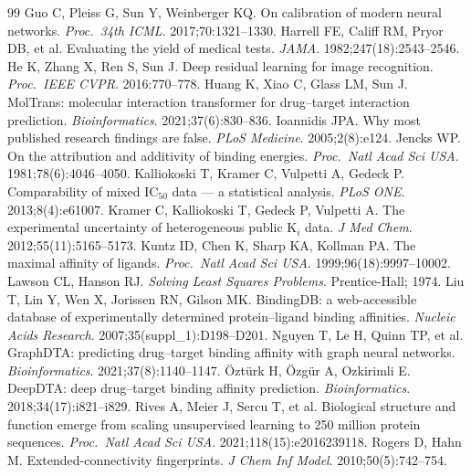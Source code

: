 \documentclass[10pt,letterpaper]{article}
\begin{document}
\begin{thebibliography}{99}
 Guo C, Pleiss G, Sun Y, Weinberger KQ. On calibration of modern neural networks. \emph{Proc.\ 34th ICML}. 2017;70:1321--1330.
 Harrell FE, Califf RM, Pryor DB, et al. Evaluating the yield of medical tests. \emph{JAMA}. 1982;247(18):2543--2546.
 He K, Zhang X, Ren S, Sun J. Deep residual learning for image recognition. \emph{Proc.\ IEEE CVPR}. 2016:770--778.
 Huang K, Xiao C, Glass LM, Sun J. MolTrans: molecular interaction transformer for drug--target interaction prediction. \emph{Bioinformatics}. 2021;37(6):830--836.
 Ioannidis JPA. Why most published research findings are false. \emph{PLoS Medicine}. 2005;2(8):e124.
 Jencks WP. On the attribution and additivity of binding energies. \emph{Proc.\ Natl Acad Sci USA}. 1981;78(6):4046--4050.
 Kalliokoski T, Kramer C, Vulpetti A, Gedeck P. Comparability of mixed IC$_{50}$ data --- a statistical analysis. \emph{PLoS ONE}. 2013;8(4):e61007.
 Kramer C, Kalliokoski T, Gedeck P, Vulpetti A. The experimental uncertainty of heterogeneous public K$_i$ data. \emph{J Med Chem}. 2012;55(11):5165--5173.
 Kuntz ID, Chen K, Sharp KA, Kollman PA. The maximal affinity of ligands. \emph{Proc.\ Natl Acad Sci USA}. 1999;96(18):9997--10002.
 Lawson CL, Hanson RJ. \emph{Solving Least Squares Problems}. Prentice-Hall; 1974.
 Liu T, Lin Y, Wen X, Jorissen RN, Gilson MK. BindingDB: a web-accessible database of experimentally determined protein--ligand binding affinities. \emph{Nucleic Acids Research}. 2007;35(suppl\_1):D198--D201.
 Nguyen T, Le H, Quinn TP, et al. GraphDTA: predicting drug--target binding affinity with graph neural networks. \emph{Bioinformatics}. 2021;37(8):1140--1147.
 \"Ozt\"urk H, \"Ozg\"ur A, Ozkirimli E. DeepDTA: deep drug--target binding affinity prediction. \emph{Bioinformatics}. 2018;34(17):i821--i829.
 Rives A, Meier J, Sercu T, et al. Biological structure and function emerge from scaling unsupervised learning to 250 million protein sequences. \emph{Proc.\ Natl Acad Sci USA}. 2021;118(15):e2016239118.
 Rogers D, Hahn M. Extended-connectivity fingerprints. \emph{J Chem Inf Model}. 2010;50(5):742--754.

\end{thebibliography}
\end{document}
